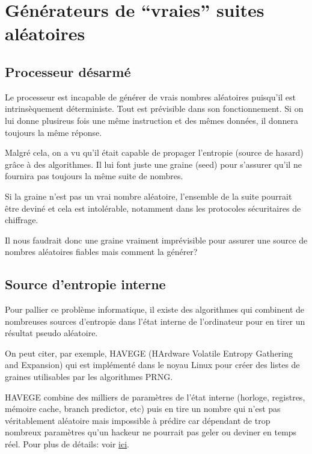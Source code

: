 \documentclass{scrartcl}
\begin{document}
\section{Générateurs de ``vraies'' suites aléatoires}\label{s:TRNG}
\subsection{Processeur désarmé}
Le processeur est incapable de générer de vrais nombres aléatoires puisqu’il est intrinsèquement déterministe. Tout est prévisible dans son fonctionnement. Si on lui donne plusireus fois une même instruction et des mêmes données, il donnera toujours la même réponse.\par
Malgré cela, on a vu qu’il était capable de propager l’entropie (source de hasard) grâce à des algorithmes. Il lui font juste une graine (seed) pour s’assurer qu’il ne fournira pas toujours la même suite de nombres.\par
Si la graine n’est pas un vrai nombre aléatoire, l’ensemble de la suite pourrait être deviné et cela est intolérable, notamment dans les protocoles sécuritaires de chiffrage.\par
Il nous faudrait donc une graine vraiment imprévisible pour assurer une source de nombres aléatoires fiables mais comment la générer?

\subsection{Source d'entropie interne}
Pour pallier ce problème informatique, il existe des algorithmes qui combinent de nombreuses sources d'entropie dans l’état interne de l’ordinateur pour en tirer un résultat pseudo aléatoire. \par
On peut citer, par exemple, HAVEGE (HArdware Volatile Entropy Gathering and Expansion) qui est implémenté dans le noyau Linux pour créer des listes de graines utilisables par les algorithmes PRNG.\par
HAVEGE combine des milliers de paramètres de l’état interne (horloge, registres, mémoire cache, branch predictor, etc) puis en tire un nombre qui n’est pas véritablement aléatoire mais impossible à prédire car dépendant de trop nombreux paramètres qu’un hackeur ne pourrait pas geler ou deviner en temps réel.
Pour plus de détails: voir \href{https://www.irisa.fr/caps/projects/hipsor/misc.php}{ici}.
\end{document}
